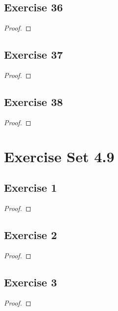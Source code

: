 \documentclass[14pt]{extarticle}
\begin{document}
\subsection{Exercise 36}

\begin{proof}

\end{proof}

\subsection{Exercise 37}

\begin{proof}

\end{proof}

\subsection{Exercise 38}

\begin{proof}

\end{proof}

\section{Exercise Set 4.9}

\subsection{Exercise 1}

\begin{proof}

\end{proof}

\subsection{Exercise 2}

\begin{proof}

\end{proof}

\subsection{Exercise 3}

\begin{proof}

\end{proof}
\end{document}

